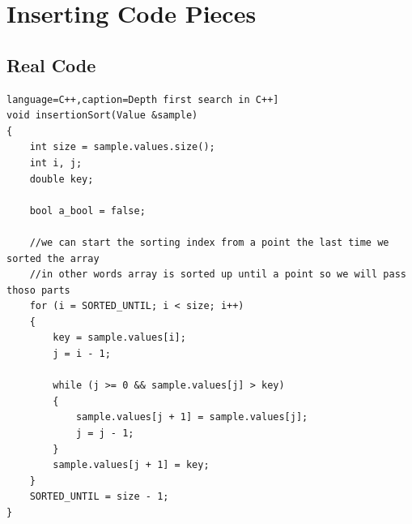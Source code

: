 \documentclass[a4paper, 12pt, titlepage]{article}
\begin{document}
\newpage

\section{Inserting Code Pieces}

\subsection{Real Code}

\begin{lstlisting}language=C++,caption=Depth first search in C++]
void insertionSort(Value &sample)
{
    int size = sample.values.size();
    int i, j;
    double key;

    bool a_bool = false;

    //we can start the sorting index from a point the last time we sorted the array
    //in other words array is sorted up until a point so we will pass thoso parts
    for (i = SORTED_UNTIL; i < size; i++)
    {
        key = sample.values[i];
        j = i - 1;
        
        while (j >= 0 && sample.values[j] > key)
        {
            sample.values[j + 1] = sample.values[j];
            j = j - 1;
        }
        sample.values[j + 1] = key;
    }
    SORTED_UNTIL = size - 1;
}
\end{lstlisting}
\end{document}
